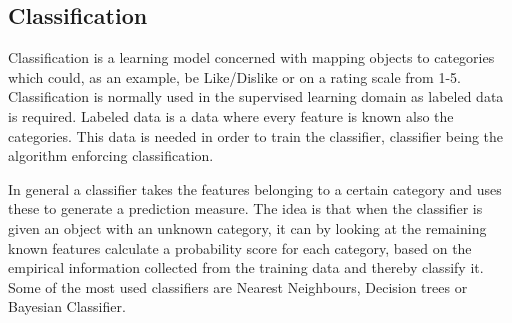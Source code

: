\subsection{Classification}
Classification is a learning model concerned with mapping objects to categories which could, as an example, be Like/Dislike or on a rating scale from 1-5. Classification is normally used in the supervised learning domain as labeled data is required. Labeled data is a data where every feature is known also the categories. This data is needed in order to train the classifier, classifier being the algorithm enforcing classification. 

In general a classifier takes the features belonging to a certain category and uses these to generate a prediction measure. The idea is that when the classifier is given an object with an unknown category, it can by looking at the remaining known features calculate a probability score for each category, based on the empirical information collected from the training data and thereby classify it. Some of the most used classifiers are Nearest Neighbours, Decision trees or Bayesian Classifier.